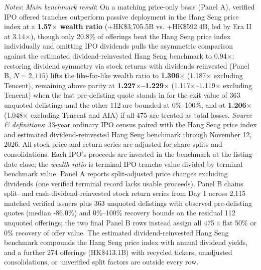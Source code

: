 \documentclass[11pt,letterpaper]{article}
\begin{document}
\begin{table}[!htbp]
\par\vspace{3pt}\noindent\parbox{\textwidth}{\scriptsize\raggedright \textit{Notes}: \textit{Main benchmark result}: On a matching price-only basis (Panel A), verified IPO offered tranches outperform passive deployment in the Hang Seng price index at a \textbf{1.57$\times$ wealth ratio} (+HK\$3,705.5B vs. +HK\$592.4B, led by Era II at 3.14$\times$), though only 20.8\% of offerings beat the Hang Seng price index individually and omitting IPO dividends pulls the asymmetric comparison against the estimated dividend-reinvested Hang Seng benchmark to 0.94$\times$; restoring dividend symmetry via stock returns with dividends reinvested (Panel B, $N = 2,115$) lifts the like-for-like wealth ratio to \textbf{1.306$\times$} (1.187$\times$ excluding Tencent), remaining above parity at \textbf{1.227$\times$–1.229$\times$} (1.117$\times$–1.119$\times$ excluding Tencent) when the last pre-delisting quote stands in for the exit value of 363 unquoted delistings and the other 112 are bounded at 0\%–100\%, and at \textbf{1.206$\times$} (1.048$\times$ excluding Tencent and AIA) if all 475 are treated as total losses. \textit{Source \& definitions}: 33-year ordinary IPO census paired with the Hang Seng price index and estimated dividend-reinvested Hang Seng benchmark through November 12, 2026. All stock price and return series are adjusted for share splits and consolidations. Each IPO's proceeds are invested in the benchmark at the listing-date close; the \textit{wealth ratio} is terminal IPO-tranche value divided by terminal benchmark value. Panel A reports split-adjusted price changes excluding dividends (one verified terminal record lacks usable proceeds). Panel B chains split- and cash-dividend-reinvested stock return series from Day 1 across 2,115 matched verified issuers plus 363 unquoted delistings with observed pre-delisting quotes (median -86.0\%) and 0\%–100\% recovery bounds on the residual 112 unquoted offerings; the two final Panel B rows instead assign all 475 a flat 50\% or 0\% recovery of offer value. The estimated dividend-reinvested Hang Seng benchmark compounds the Hang Seng price index with annual dividend yields, and a further 274 offerings (HK\$413.1B) with recycled tickers, unadjusted consolidations, or unverified split factors are outside every row.}
\end{table}
\end{document}
